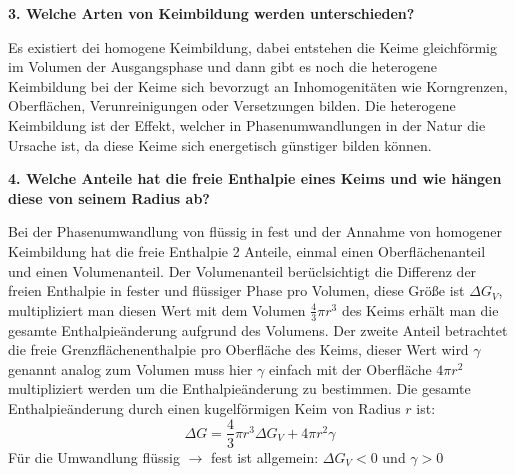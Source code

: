 \noindent\textbf{3. Welche Arten von Keimbildung werden unterschieden?}\\
\begin{addmargin}[25pt]{0pt}
Es existiert dei homogene Keimbildung, dabei entstehen die Keime gleichförmig im Volumen der Ausgangsphase und dann gibt es noch die heterogene Keimbildung bei der Keime sich bevorzugt an Inhomogenitäten wie Korngrenzen, Oberflächen, Verunreinigungen oder Versetzungen bilden. Die heterogene Keimbildung ist der Effekt, welcher in Phasenumwandlungen in der Natur die Ursache ist, da diese Keime sich energetisch günstiger bilden können.\\
\end{addmargin}

\noindent\textbf{4. Welche Anteile hat die freie Enthalpie eines Keims
und wie hängen diese von seinem Radius ab? }\\
\begin{addmargin}[25pt]{0pt}
Bei der Phasenumwandlung von flüssig in fest und der Annahme von homogener Keimbildung hat die freie Enthalpie 2 Anteile, einmal einen Oberflächenanteil und einen Volumenanteil. Der Volumenanteil berüclsichtigt die Differenz der freien Enthalpie in fester und flüssiger Phase pro Volumen, diese Größe ist $\Delta G_V$, multipliziert man diesen Wert mit dem Volumen $\frac{4}{3}\pi r^3$ des Keims erhält man die gesamte Enthalpieänderung aufgrund des Volumens. Der zweite Anteil betrachtet die freie Grenzflächenenthalpie pro Oberfläche des Keims, dieser Wert wird $\gamma$ genannt analog zum Volumen muss hier $\gamma$ einfach mit der Oberfläche $4\pi r^2$ multipliziert werden um die Enthalpieänderung zu bestimmen. Die gesamte Enthalpieänderung durch einen kugelförmigen Keim von Radius $r$ ist:
\begin{equation}\label{eq:enthalpie_homogene_Keimbildung}
    \Delta G = \frac{4}{3}\pi r^3 \Delta G_V + 4\pi r^2 \gamma
\end{equation}
Für die Umwandlung flüssig $\rightarrow$ fest ist allgemein: $\Delta G_V <0$ und $\gamma >0$\\
\end{addmargin}

